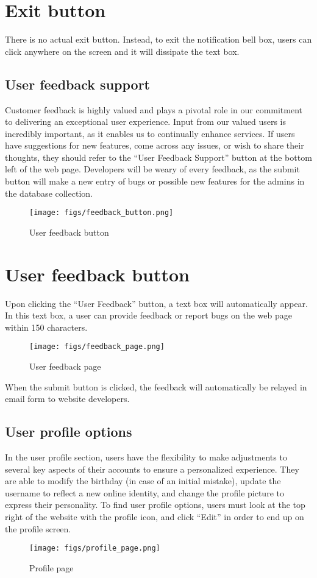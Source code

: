\documentclass[conference]{IEEEtran}
\begin{document}
\section*{Exit button}
There is no actual exit button. Instead, to exit the notification bell box, users can click anywhere on the screen and it will dissipate the text box. 
\subsection{User feedback support}
Customer feedback is highly valued and plays a pivotal role in our commitment to delivering an exceptional user experience. Input from our valued users is incredibly important, as it enables us to continually enhance services. If users have suggestions for new features, come across any issues, or wish to share their thoughts, they should refer to the “User Feedback Support” button at the bottom left of the web page. Developers will be weary of every feedback, as the submit button will make a new entry of bugs or possible new features for the admins in the database collection. 
\begin{figure}[H]
\centering
\texttt{[image: figs/feedback\_button.png]}
\caption{User feedback button}
\label{fig:User feedback button}
\end{figure}
\section*{User feedback button}
Upon clicking the “User Feedback” button, a text box will automatically appear. In this text box, a user can provide feedback or report bugs on the web page within 150 characters.
\begin{figure}[H]
\centering
\texttt{[image: figs/feedback\_page.png]}
\caption{User feedback page}
\label{fig:User feedback page}
\end{figure}
When the submit button is clicked, the feedback will automatically be relayed in email form to website developers.
\subsection{User profile options}
In the user profile section, users have the flexibility to make adjustments to several key aspects of their accounts to ensure a personalized experience. They are able to modify the birthday (in case of an initial mistake), update the username to reflect a new online identity, and change the profile picture to express their personality. To find user profile options, users must look at the top right of the website with the profile icon, and click “Edit” in order to end up on the profile screen.
\begin{figure}[H]
\centering
\texttt{[image: figs/profile\_page.png]}
\caption{Profile page}
\label{fig:Profile page}
\end{figure}
\end{document}
